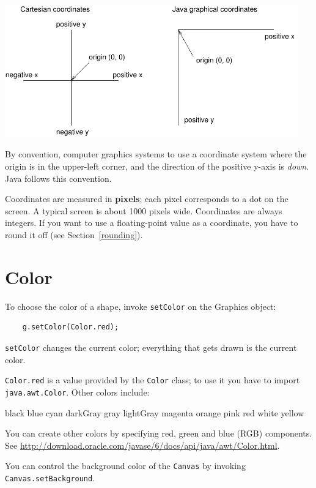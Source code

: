 \includegraphics[width=5in]{figs/coordinates.pdf}


By convention, computer graphics systems to use a
coordinate system where the origin is in the
upper-left corner, and the direction of the
positive y-axis is {\em down}.  Java follows this convention.


Coordinates are measured in {\bf pixels}; each pixel corresponds to
a dot on the screen.  A typical screen is about
1000 pixels wide.  Coordinates are always integers.  If you want to
use a floating-point value as a coordinate, you have to round it off
(see Section~\ref{rounding}).


\section{Color}

To choose the color of a shape, invoke {\tt setColor} on the Graphics
object:

\begin{lstlisting}
    g.setColor(Color.red);
\end{lstlisting}
%
{\tt setColor} changes the current color; everything that gets drawn
is the current color.

{\tt Color.red} is a value provided by the {\tt Color}
class; to use it you have to import {\tt java.awt.Color}.
Other colors include:

\begin{verbatimtab}
black     blue    cyan   darkGray   gray   lightGray
magenta   orange  pink   red        white  yellow
\end{verbatimtab}
%
You can create other colors by specifying red, green and blue (RGB)
components.
See \url{http://download.oracle.com/javase/6/docs/api/java/awt/Color.html}.

You can control the background color of the {\tt Canvas} by
invoking {\tt Canvas.setBackground}.


